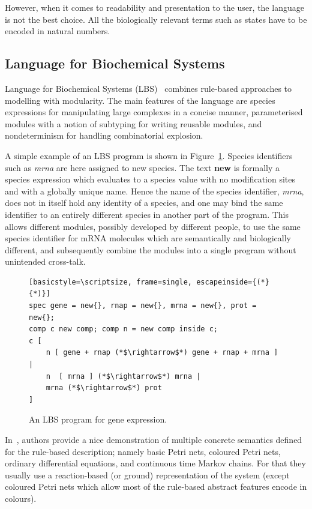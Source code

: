 \documentclass[11pt,a4paper]{report}
\begin{document}
However, when it comes to readability and presentation to the user, the language is not the best choice. All the biologically relevant terms such as states have to be encoded in natural numbers.

\subsection{Language for Biochemical Systems}

Language for Biochemical Systems (LBS)~\cite{Pedersen} combines rule-based approaches to modelling with modularity. The main features of the language are species expressions for manipulating large complexes in a concise manner, parameterised modules with a notion of subtyping for writing reusable modules, and nondeterminism for handling combinatorial explosion.

A simple example of an LBS program is shown in Figure~\ref{LBS_example}. Species identifiers such as \emph{mrna} are here assigned to new species. The text \textbf{new{}} is formally a species expression which evaluates to a species value with no modification sites and with a globally unique name. Hence the name of the species identifier, \emph{mrna}, does not in itself hold any identity of a species, and one may bind the same identifier to an entirely different species in another part of the program. This allows different modules, possibly developed by different people, to use the same species identifier for mRNA molecules which are semantically and biologically different, and subsequently combine the modules into a single program without unintended cross-talk.

\begin{figure}[!h]
\lstset{language=LBS}
\begin{lstlisting}[basicstyle=\scriptsize, frame=single, escapeinside={(*}{*)}]
spec gene = new{}, rnap = new{}, mrna = new{}, prot = new{}; 
comp c new comp; comp n = new comp inside c;
c [ 
	n [ gene + rnap (*$\rightarrow$*) gene + rnap + mrna ] | 
	n  [ mrna ] (*$\rightarrow$*) mrna | 
	mrna (*$\rightarrow$*) prot
]
\end{lstlisting}
\caption{An LBS program for gene expression.}\label{LBS_example}
\end{figure}

In~\cite{Pedersen}, authors provide a nice demonstration of multiple concrete semantics defined for the rule-based description; namely basic Petri nets, coloured Petri nets, ordinary differential equations, and continuous time Markov chains. For that they usually use a reaction-based (or ground) representation of the system (except coloured Petri nets which allow most of the rule-based abstract features encode in colours).
\end{document}
